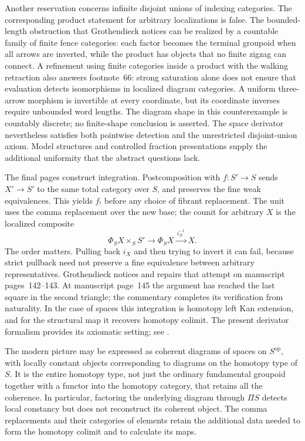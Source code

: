 Another reservation concerns infinite disjoint unions of indexing categories. The corresponding product statement for arbitrary localizations is false. The bounded-length obstruction that Grothendieck notices can be realized by a countable family of finite fence categories: each factor becomes the terminal groupoid when all arrows are inverted, while the product has objects that no finite zigzag can connect. A refinement using finite categories inside a product with the walking retraction also answers footnote~66: strong saturation alone does not ensure that evaluation detects isomorphisms in localized diagram categories. A uniform three-arrow morphism is invertible at every coordinate, but its coordinate inverses require unbounded word lengths. The diagram shape in this counterexample is countably discrete; no finite-shape conclusion is asserted. The space derivator nevertheless satisfies both pointwise detection and the unrestricted disjoint-union axiom. Model structures and controlled fraction presentations supply the additional uniformity that the abstract questions lack.

The final pages construct integration. Postcomposition with $f:S'\to S$ sends $X'\to S'$ to the same total category over $S$, and preserves the fine weak equivalences. This yields $f_!$ before any choice of fibrant replacement. The unit uses the comma replacement over the new base; the counit for arbitrary $X$ is the localized composite
\[
\Phi_SX\times_S S'\longrightarrow\Phi_SX
  \xrightarrow{\,i_X^{-1}\,}X.
\]
The order matters. Pulling back $i_X$ and then trying to invert it can fail, because strict pullback need not preserve a fine equivalence between arbitrary representatives. Grothendieck notices and repairs that attempt on manuscript pages~142--143. At manuscript page~145 the argument has reached the last square in the second triangle; the commentary completes its verification from naturality. In the case of spaces this integration is homotopy left Kan extension, and for the structural map it recovers homotopy colimit. The present derivator formalism provides its axiomatic setting; see \citet{Groth2013}.

The modern picture may be expressed as coherent diagrams of spaces on $S^{\mathrm{op}}$, with locally constant objects corresponding to diagrams on the homotopy type of $S$. It is the entire homotopy type, not just the ordinary fundamental groupoid together with a functor into the homotopy category, that retains all the coherence. In particular, factoring the underlying diagram through $\Pi S$ detects local constancy but does not reconstruct its coherent object. The comma replacements and their categories of elements retain the additional data needed to form the homotopy colimit and to calculate its maps.
\endgroup
